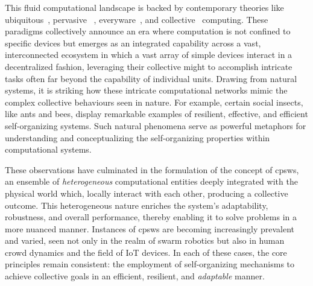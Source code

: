\begin{refsection}
This fluid computational landscape is backed by contemporary theories like  ubiquitous~\cite{ubiquitous}, pervasive
 ~\cite{DBLP:journals/computer/SahaM03}, everyware~\cite{greenfield2010everyware}, and collective~\cite{DBLP:journals/computer/Abowd16} computing.
%
These paradigms collectively announce an era where computation 
 is not confined to specific devices but emerges as an integrated capability across a vast, 
 interconnected ecosystem in which a vast array of simple devices interact in a decentralized fashion, 
 leveraging their collective might to accomplish intricate tasks often far beyond the capability of individual units. 
%
Drawing from natural systems, 
 it is striking how these intricate computational networks mimic the complex collective behaviours seen in nature. 
 For example, certain social insects, like ants and bees, display remarkable examples of resilient, effective, and efficient self-organizing systems. 
 Such natural phenomena serve as powerful metaphors for understanding and conceptualizing the self-organizing properties within computational systems.
 
These observations have culminated in the formulation of the concept of \acp{cpsw}, 
 an ensemble of \emph{heterogeneous} computational entities deeply integrated with the physical world which, locally interact with each other, producing a collective outcome. %
 This heterogeneous nature enriches the system's adaptability, robustness, and overall performance, thereby enabling it to solve problems in a more nuanced manner.
%
Instances of \acp{cpsw} are becoming increasingly prevalent and varied, 
 seen not only in the realm of swarm robotics but also in human crowd dynamics and the field of IoT devices. 
 In each of these cases, the core principles remain consistent: the employment of self-organizing mechanisms to achieve collective goals in an efficient, resilient, and \emph{adaptable} manner.


\end{refsection}
